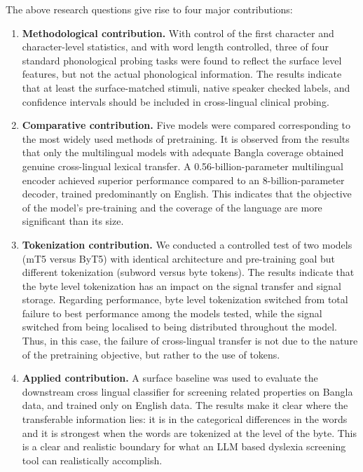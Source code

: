 \documentclass[preprint,12pt]{elsarticle}
\begin{document}
The above research questions give rise to four major contributions:
\begin{enumerate}
\item \textbf{Methodological contribution.} With control of the first character and character-level statistics, and with word length controlled, three of four standard phonological probing tasks were found to reflect the surface level features, but not the actual phonological information. The results indicate that at least the surface-matched stimuli, native speaker checked labels, and confidence intervals should be included in cross-lingual clinical probing.
\item \textbf{Comparative contribution.} Five models were compared corresponding to the most widely used methods of pretraining. It is observed from the results that only the multilingual models with adequate Bangla coverage obtained genuine cross-lingual lexical transfer. A 0.56-billion-parameter multilingual encoder achieved superior performance compared to an 8-billion-parameter decoder, trained predominantly on English. This indicates that the objective of the model's pre-training and the coverage of the language are more significant than its size.
\item \textbf{Tokenization contribution.} We conducted a controlled test of two models (mT5 versus ByT5) with identical architecture and pre-training goal but different tokenization (subword versus byte tokens). The results indicate that the byte level tokenization has an impact on the signal transfer and signal storage. Regarding performance, byte level tokenization switched from total failure to best performance among the models tested, while the signal switched from being localised to being distributed throughout the model. Thus, in this case, the failure of cross-lingual transfer is not due to the nature of the pretraining objective, but rather to the use of tokens.
\item \textbf{Applied contribution.} A surface baseline was used to evaluate the downstream cross lingual classifier for screening related properties on Bangla data, and trained only on English data. The results make it clear where the transferable information lies: it is in the categorical differences in the words and it is strongest when the words are tokenized at the level of the byte. This is a clear and realistic boundary for what an LLM based dyslexia screening tool can realistically accomplish.
\end{enumerate}

\end{document}
